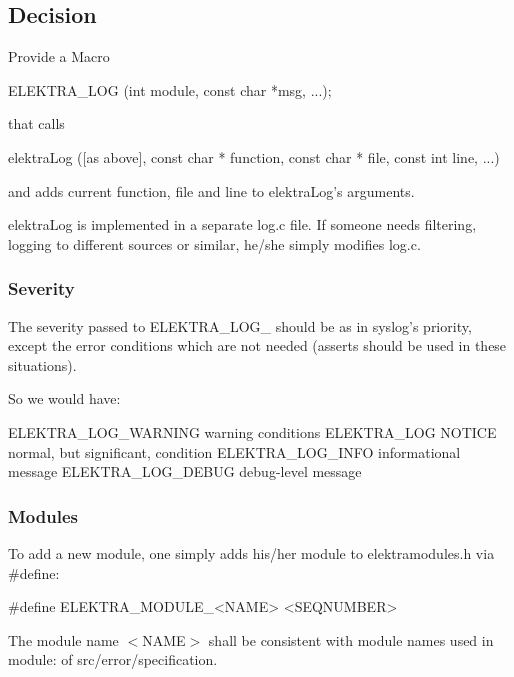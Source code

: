 \subsection*{Decision}

Provide a Macro \begin{DoxyVerb}ELEKTRA_LOG (int module, const char *msg, ...);
\end{DoxyVerb}


that calls \begin{DoxyVerb}elektraLog ([as above], const char * function, const char * file,
        const int line, ...)
\end{DoxyVerb}


and adds current function, file and line to {\ttfamily elektra\+Log}'s arguments.

{\ttfamily elektra\+Log} is implemented in a separate {\ttfamily log.\+c} file. If someone needs filtering, logging to different sources or similar, he/she simply modifies {\ttfamily log.\+c}.

\subsubsection*{Severity}

The severity passed to {\ttfamily E\+L\+E\+K\+T\+R\+A\+\_\+\+L\+O\+G\+\_\+} should be as in syslog's priority, except the error conditions which are not needed (asserts should be used in these situations).

So we would have\+: \begin{DoxyVerb}    ELEKTRA_LOG_WARNING    warning conditions
    ELEKTRA_LOG            NOTICE  normal, but significant, condition
    ELEKTRA_LOG_INFO       informational message
    ELEKTRA_LOG_DEBUG      debug-level message
\end{DoxyVerb}


\subsubsection*{Modules}

To add a new module, one simply adds his/her module to {\ttfamily elektramodules.\+h} via {\ttfamily \#define}\+: \begin{DoxyVerb}#define ELEKTRA_MODULE_<NAME> <SEQNUMBER>
\end{DoxyVerb}


The module name {\ttfamily $<$N\+A\+M\+E$>$} shall be consistent with module names used in {\ttfamily module\+:} of {\ttfamily src/error/specification}.

